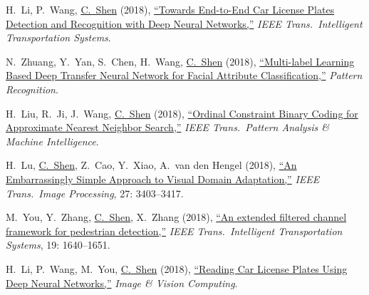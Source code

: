 \documentclass[9pt, a4paper]{article}
\newcommand{\years}[1]{\marginnote{\scriptsize #1}}
\def\highlight{\uline}
\begin{document}
\years{2018} H.~Li, P.~Wang, \highlight{C.~Shen} (2018),
\href{http://www.google.com/search?lr=&ie=UTF-8&oe=UTF-8&q=Towards+End-to-End+Car+License+Plates+Detection+and+Recognition+with+Deep+Neural+Networks+Hui+Li%2C+Peng+Wang%2C+Chunhua+Shen}{``Towards End-to-End Car License Plates Detection and Recognition with Deep Neural Networks,{}''}
\emph{IEEE Trans.\  Intelligent Transportation Systems}.

\medskip

\years{2018} N.~Zhuang, Y.~Yan, S.~Chen, H.~Wang, \highlight{C.~Shen} (2018),
\href{http://www.google.com/search?lr=&ie=UTF-8&oe=UTF-8&q=Multi-label+Learning+Based+Deep+Transfer+Neural+Network+for+Facial+Attribute+Classification+Ni+Zhuang%2C+Yan+Yan%2C+Si+Chen%2C+Hanzi+Wang%2C+Chunhua+Shen}{``Multi-label Learning Based Deep Transfer Neural Network for Facial Attribute Classification,{}''}
\emph{Pattern Recognition}.

\medskip

\years{2018} H.~Liu, R.~Ji, J.~Wang, \highlight{C.~Shen} (2018),
\href{http://www.google.com/search?lr=&ie=UTF-8&oe=UTF-8&q=Ordinal+Constraint+Binary+Coding+for+Approximate+Nearest+Neighbor+Search+Hong+Liu%2C+Rongrong+Ji%2C+Jingdong+Wang%2C+Chunhua+Shen}{``Ordinal Constraint Binary Coding for Approximate Nearest Neighbor Search,{}''}
\emph{IEEE Trans.\  Pattern Analysis \& Machine Intelligence}.

\medskip

\years{2018} H.~Lu, \highlight{C.~Shen}, Z.~Cao, Y.~Xiao, A.~van den Hengel (2018),
\href{http://www.google.com/search?lr=&ie=UTF-8&oe=UTF-8&q=An+Embarrassingly+Simple+Approach+to+Visual+Domain+Adaptation+Hao+Lu%2C+Chunhua+Shen%2C+Zhiguo+Cao%2C+Yang+Xiao%2C+Anton+van+den+Hengel}{``An Embarrassingly Simple Approach to Visual Domain Adaptation,{}''}
\emph{IEEE Trans.\  Image Processing}, 27: 3403--3417.

\medskip

\years{2018} M.~You, Y.~Zhang, \highlight{C.~Shen}, X.~Zhang (2018),
\href{http://www.google.com/search?lr=&ie=UTF-8&oe=UTF-8&q=An+extended+filtered+channel+framework+for+pedestrian+detection+Minyu+You%2C+Yubin+Zhang%2C+Chunhua+Shen%2C+Xinyu+Zhang}{``An extended filtered channel framework for pedestrian detection,{}''}
\emph{IEEE Trans.\  Intelligent Transportation Systems}, 19: 1640--1651.

\medskip

\years{2018} H.~Li, P.~Wang, M.~You, \highlight{C.~Shen} (2018),
\href{http://www.google.com/search?lr=&ie=UTF-8&oe=UTF-8&q=Reading+Car+License+Plates+Using+Deep+Neural+Networks+Hui+Li%2C+Peng+Wang%2C+Mingyu+You%2C+Chunhua+Shen}{``Reading Car License Plates Using Deep Neural Networks,{}''}
\emph{Image \& Vision Computing}.
\end{document}
